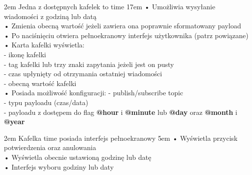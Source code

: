{2em}{
    Jedna z dostępnych kafelek to time
}
{17em}{
    • Umożliwia wysyłanie wiadomości z godziną lub datą\\
    • Zmienia obecną wartość jeżeli zawiera ona poprawnie sformatowany payload\\
    • Po naciśnięciu otwiera pełnoekranowy interfejs użytkownika (patrz powiązane)\\

    • Karta kafelki wyświetla:\\
    - ikonę kafelki\\
    - tag kafelki lub trzy znaki zapytania jeżeli jest on pusty\\
    - czas upłynięty od otrzymania ostatniej wiadomości\\
    - obecną wartość kafelki\\

    • Posiada możliwość konfiguracji:
    - publish/subscribe topic\\
    - typu payloadu (czas/data)\\
    - payloadu z dostępem do flag \textbf{@hour} i \textbf{@minute} lub \textbf{@day} oraz \textbf{@month} i \textbf{@year}
}

{2em}{
    Kafelka time posiada interfejs pełnoekranowy
}
{5em}{
    • Wyświetla przycisk potwierdzenia oraz anulowania\\
    • Wyświetla obecnie ustawioną godzinę lub datę\\
    • Interfejs wyboru godziny lub daty
}

